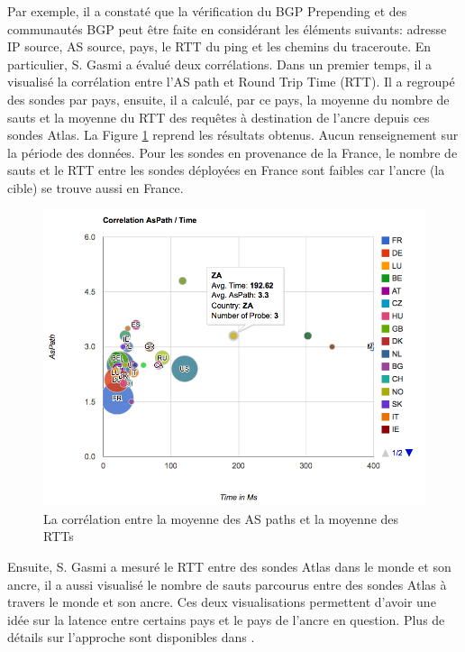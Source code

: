 Par exemple, il a constaté que la vérification du BGP Prepending et des communautés BGP peut être faite en  considérant les éléments suivants: adresse IP source, AS source, pays, le RTT du ping et les chemins du traceroute. En particulier, S. Gasmi a évalué deux corrélations. Dans un premier temps, il a visualisé la corrélation entre l'AS path et Round Trip Time (RTT). Il a regroupé des sondes par pays, ensuite, il a calculé, par ce pays, la moyenne du nombre de sauts et la moyenne du RTT des requêtes à destination de l'ancre depuis ces sondes Atlas.
La Figure \ref{fig:1-AS-Path-Time-correlationv} reprend les résultats obtenus. Aucun renseignement sur la période des données. Pour les sondes en provenance de la France,  le nombre de sauts et le RTT entre les sondes déployées en France sont faibles car l'ancre (la cible) se trouve aussi en France.
\begin{figure}[H]
	\centering
	\captionsetup{justification=centering}
	\includegraphics[width=1\linewidth]{illustrations/1-AS-Path-Time-correlation}
	\caption{La corrélation entre la moyenne des AS paths et la moyenne des RTTs \cite{Salim-Gasmi}}
	\label{fig:1-AS-Path-Time-correlationv}
\end{figure}


Ensuite, S. Gasmi a mesuré le RTT entre des sondes Atlas dans le monde et son ancre, il a aussi visualisé le nombre de sauts parcourus entre des sondes Atlas à travers le monde et son ancre. Ces deux visualisations permettent d'avoir une idée sur la latence entre certains pays et le pays de l'ancre en question. Plus de détails sur l'approche sont disponibles dans \cite{Salim-Gasmi}.


